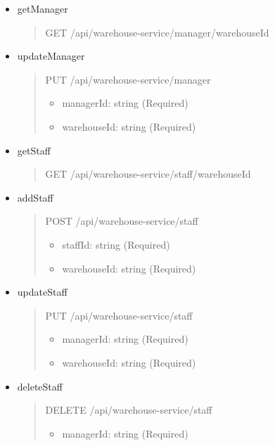 \begin{itemize}
	\item getManager
	      \begin{quote}
		      GET /api/warehouse-service/manager/{warehouseId}
	      \end{quote}

	\item updateManager
	      \begin{quote}
		      PUT /api/warehouse-service/manager
			  \begin{itemize}
				\item managerId: string (Required)
				\item warehouseId: string (Required)
			\end{itemize}
	      \end{quote}

	\item getStaff
	      \begin{quote}
		      GET /api/warehouse-service/staff/{warehouseId}
	      \end{quote}

	\item addStaff
	      \begin{quote}
		      POST /api/warehouse-service/staff
			  \begin{itemize}
				\item staffId: string (Required)
				\item warehouseId: string (Required)
			\end{itemize}
	      \end{quote}

	\item updateStaff
	      \begin{quote}
		      PUT /api/warehouse-service/staff
			  \begin{itemize}
				\item managerId: string (Required)
				\item warehouseId: string (Required)
			\end{itemize}
	      \end{quote}

	\item deleteStaff
	      \begin{quote}
		      DELETE /api/warehouse-service/staff
			  \begin{itemize}
				\item managerId: string (Required)
			\end{itemize}
	      \end{quote}


\end{itemize}
